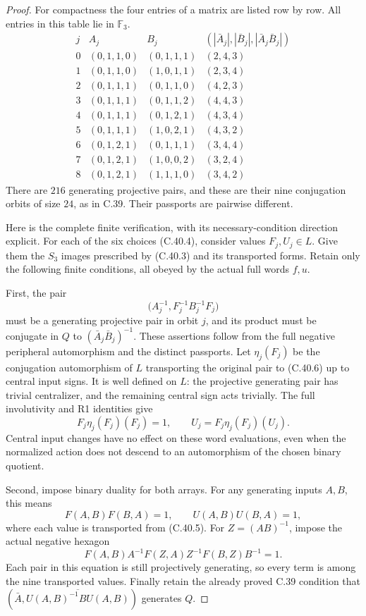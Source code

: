 \begin{proof}
For compactness the four entries of a matrix are listed
row by row. All entries in this table lie in \(\mathbb F_3\).
\[
\begin{array}{c|c|c|c}
j&A_j&B_j&(|\bar A_j|,|\bar B_j|,|\bar A_j\bar B_j|)\\ \hline
0&(0,1,1,0)&(0,1,1,1)&(2,4,3)\\
1&(0,1,1,0)&(1,0,1,1)&(2,3,4)\\
2&(0,1,1,1)&(0,1,1,0)&(4,2,3)\\
3&(0,1,1,1)&(0,1,1,2)&(4,4,3)\\
4&(0,1,1,1)&(0,1,2,1)&(4,3,4)\\
5&(0,1,1,1)&(1,0,2,1)&(4,3,2)\\
6&(0,1,2,1)&(0,1,1,1)&(3,4,4)\\
7&(0,1,2,1)&(1,0,0,2)&(3,2,4)\\
8&(0,1,2,1)&(1,1,1,0)&(3,4,2)
\end{array}
 \tag{C.40.5}
\]
There are \(216\) generating projective pairs, and these
are their nine conjugation orbits of size \(24\), as in
C.39. Their passports are pairwise different.

Here is the complete finite verification, with its
necessary-condition direction explicit. For each of
the six choices (C.40.4), consider values
\(F_j,U_j\in L\). Give them the \(S_3\) images prescribed
by (C.40.3) and its transported forms. Retain only the
following finite conditions, all obeyed by the actual
full words \(f,u\).

First, the pair
\[
       \bigl(A_j^{-1},F_j^{-1}B_j^{-1}F_j\bigr)
 \tag{C.40.6}
\]
must be a generating projective pair in orbit \(j\), and
its product must be conjugate in \(Q\) to
\((\bar A_j\bar B_j)^{-1}\). These assertions follow
from the full negative peripheral automorphism and the
distinct passports. Let \(\eta_j(F_j)\) be the conjugation
automorphism of \(L\) transporting the original pair
to (C.40.6) up to central input signs. It is well defined
on \(L\): the projective generating pair has trivial
centralizer, and the remaining central sign acts trivially.
The full involutivity and R1 identities give
\[
             F_j\eta_j(F_j)(F_j)=1,\qquad
             U_j=F_j\eta_j(F_j)(U_j).
 \tag{C.40.7}
\]
Central input changes have no effect on these word
evaluations, even when the normalized action does not
descend to an automorphism of the chosen binary quotient.

Second, impose binary duality for both arrays. For any
generating inputs \(A,B\), this means
\[
                      F(A,B)F(B,A)=1,\qquad
                      U(A,B)U(B,A)=1,
\]
where each value is transported from (C.40.5).
For \(Z=(AB)^{-1}\), impose the actual negative hexagon
\[
                  F(A,B)A^{-1}F(Z,A)Z^{-1}F(B,Z)B^{-1}=1.
 \tag{C.40.8}
\]
Each pair in this equation is still projectively generating,
so every term is among the nine transported values.
Finally retain the already proved C.39 condition that
\((\bar A,\overline{U(A,B)^{-1}BU(A,B)})\) generates \(Q\).


\end{proof}
